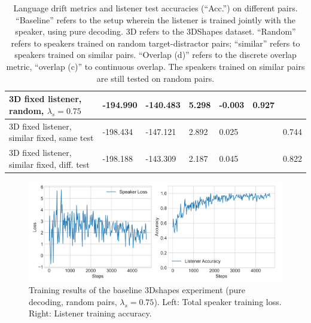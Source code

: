 \begin{table}[]
\begin{tabularx}{\textwidth}{|X|l|l|X|X|X|X|}
		3D fixed listener, random, $\lambda_s = 0.75$&      -194.990          &     -140.483                  &             5.298         &         -0.003            &                   0.927                      &                                           \\ \hline
		3D fixed listener, similar fixed, same test &  -198.434       &      -147.121     &     2.892 &    0.025         &        &      0.744          \\ \hline
		3D fixed listener, similar fixed, diff. test & -198.188   & -143.309      & 2.187   & 0.045    &    &   0.822     \\ \hline
	\end{tabularx}
	\caption{\label{tab:3dshapes_drift_metrics_basic_baseline} Language drift metrics and listener test accuracies (``Acc.'') on different pairs. 
		``Baseline'' refers to the setup wherein the listener is trained jointly with the speaker, using pure decoding. 3D refers to the 3DShapes dataset. ``Random'' refers to speakers trained on random target-distractor pairs; ``similar'' refers to speakers trained on similar pairs. ``Overlap (d)'' refers to the discrete overlap metric, ``overlap (c)'' to continuous overlap. The speakers trained on similar pairs are still tested on random pairs.}
\end{table}

\begin{figure}[h]
	\centering
	\includegraphics[width=\linewidth]{images/3dshapes_refgame_49_pure_075.png}
	\caption{Training results of the baseline 3Dshapes experiment (pure decoding, random pairs, $\lambda_s = 0.75$). Left: Total speaker training loss. Right: Listener training accuracy.}
	\label{fig:3dshapes_baseline_075_speaker_loss_listener_acc}
\end{figure}

